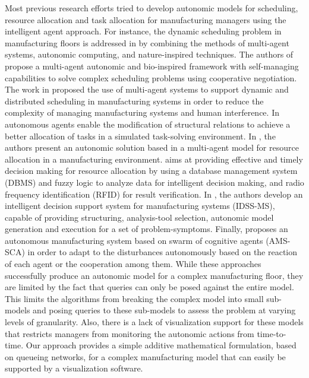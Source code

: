 \documentclass[a4paper, 12pt]{article} %
\begin{document}
Most previous research efforts tried to develop autonomic models for scheduling, resource allocation and task allocation for manufacturing managers using the intelligent agent approach. For instance, the dynamic scheduling problem in manufacturing floors is addressed in \cite{Pereira2010} by combining the methods of multi-agent systems, autonomic computing, and nature-inspired techniques. The authors of \cite{Madureira2008} propose a multi-agent autonomic and bio-inspired framework with self-managing capabilities to solve complex scheduling problems using cooperative negotiation. The work in \cite{Madureira2010} proposed the use of multi-agent systems to support dynamic and distributed scheduling in manufacturing systems in order to reduce the complexity of managing manufacturing systems and human interference. In \cite{Kota2012} autonomous agents enable the modification of  structural relations to achieve a better allocation of tasks in a simulated task-solving environment. In \cite{Bastos2004}, the authors present an autonomic solution based in a multi-agent model for resource allocation in a manufacturing environment. \cite{Lee2014} aims at providing effective and timely decision making for resource allocation by using a database management system (DBMS) and fuzzy logic to analyze data for intelligent decision making, and radio frequency identification (RFID) for result verification. In \cite{Delen2005}, the authors develop an intelligent decision support system for manufacturing systems (IDSS-MS), capable of providing structuring, analysis-tool selection, autonomic model generation and execution for a set of problem-symptoms. Finally, \cite{Park2005} proposes an autonomous manufacturing system based on swarm of cognitive agents (AMS-SCA) in order to adapt to the disturbances autonomously based on the reaction of each agent or the cooperation among them. While these approaches successfully produce an autonomic model for a complex manufacturing floor, they are limited by the fact that queries can only be posed against the entire model. This limits the algorithms from breaking the complex model into  small sub-models and posing queries to these sub-models to assess the problem at varying levels of granularity. Also, there is a lack of  visualization support for these models that restricts  managers from monitoring the autonomic actions from time-to-time. Our approach provides a simple additive mathematical formulation, based on queueing networks, for a complex manufacturing model that can easily be supported by a visualization software.
\end{document}
